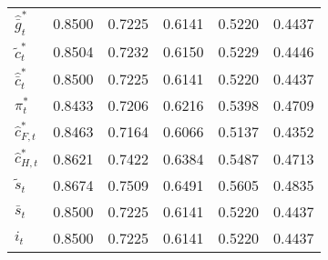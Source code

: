 \begin{center}
\begin{longtable}{lccccc}
${\hat {\bar g}_t^*}  $	 & 	    0.8500	 & 	    0.7225	 & 	    0.6141	 & 	    0.5220	 & 	    0.4437 \\ 
${\tilde c_t^*}       $	 & 	    0.8504	 & 	    0.7232	 & 	    0.6150	 & 	    0.5229	 & 	    0.4446 \\ 
${\hat {\bar c}_t^*}  $	 & 	    0.8500	 & 	    0.7225	 & 	    0.6141	 & 	    0.5220	 & 	    0.4437 \\ 
${\pi_t^*}            $	 & 	    0.8433	 & 	    0.7206	 & 	    0.6216	 & 	    0.5398	 & 	    0.4709 \\ 
${\hat c_{F,t}^*}     $	 & 	    0.8463	 & 	    0.7164	 & 	    0.6066	 & 	    0.5137	 & 	    0.4352 \\ 
${\hat c_{H,t}^*}     $	 & 	    0.8621	 & 	    0.7422	 & 	    0.6384	 & 	    0.5487	 & 	    0.4713 \\ 
${\tilde s_t}         $	 & 	    0.8674	 & 	    0.7509	 & 	    0.6491	 & 	    0.5605	 & 	    0.4835 \\ 
${\bar s_t}           $	 & 	    0.8500	 & 	    0.7225	 & 	    0.6141	 & 	    0.5220	 & 	    0.4437 \\ 
${i_t}                $	 & 	    0.8500	 & 	    0.7225	 & 	    0.6141	 & 	    0.5220	 & 	    0.4437 \\ 
\end{longtable}
 \end{center}

